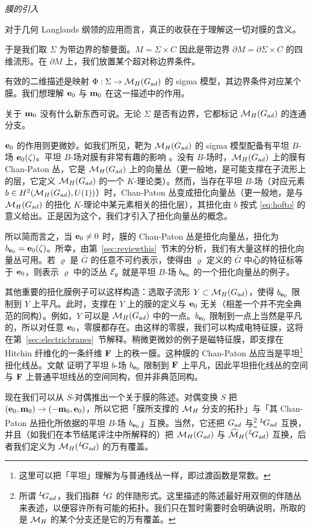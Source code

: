 \par\medskip\emph{膜的引入}

对于几何 Langlands 纲领的应用而言，真正的收获在于理解这一切对膜的含义。

于是我们取 $\Sigma$ 为带边界的黎曼面。$M=\Sigma\times C$ 因此是带边界 $\partial M=\partial\Sigma\times C$ 的四维流形。在 $\partial M$ 上，我们放置某个超对称边界条件。

有效的二维描述是映射 $\Phi:\Sigma\to \MHAD$ 的 sigma 模型，其边界条件对应某个膜。我们想理解 ${\bf e}_0$ 与 ${\bf m}_0$ 在这一描述中的作用。

关于 ${\bf m}_0$ 没有什么新东西可说。无论 $\Sigma$ 是否有边界，它都标记 $\MHAD$ 的连通分支。

${\bf e}_0$ 的作用则更微妙。如我们所见，靶为 $\MHAD$ 的 sigma 模型配备有平坦 $B$-场 ${\bf e}_0(\zeta)$。平坦 $B$-场对膜有非常有趣的影响 \cite{ref102}。没有 $B$-场时，$\MHAD$ 上的膜有 Chan-Paton 丛，它是 $\MHAD$ 上的向量丛（更一般地，是可能支撑在子流形上的层，它定义 $\MHAD$ 的一个 $K$-理论类）。然而，当存在平坦 $B$-场（对应元素 $b\in H^2(\MHAD,U(1))$）时，Chan-Paton 丛变成扭化向量丛（更一般地，是与 $\MHAD$ 的扭化 $K$-理论中某元素相关的扭化层），其扭化由 $b$ 按式 \eqref{eq:hofto} 的意义给出。正是因为这个，我们才引入了扭化向量丛的概念。

所以简而言之，当 ${\bf e}_0\not=0$ 时，膜的 Chan-Paton 丛是扭化向量丛，扭化为 $b_{{\bf e}_0}={\bf e}_0(\zeta)$。所幸，由第~\ref{sec:reviewthis}~节末的分析，我们有大量这样的扭化向量丛可用。若 $\varrho$ 是 $\bar G$ 的任意不可约表示，使得由 $\varrho$ 定义的 $\bar G$ 中心的特征标等于 ${\bf e}_0$，则表示 $\varrho$ 中的泛丛 ${\EUE}_\varrho$ 就是平坦 $B$-场 $b_{{\bf e}_0}$ 的一个扭化向量丛的例子。

其他重要的扭化膜例子可以这样构造：选取子流形 $Y\subset \MHAD$，使得 $b_{{\bf e}_0}$ 限制到 $Y$ 上平凡。此时，支撑在 $Y$ 上的膜的定义与 ${\bf e}_0$ 无关（相差一个并不完全典范的同构）。例如，$Y$ 可以是 $\MHAD$ 中的一点。$b_{{\bf e}_0}$ 限制到一点上当然是平凡的，所以对任意 ${\bf e}_0$，零膜都存在。由这样的零膜，我们可以构成电特征膜，这将在第~\ref{sec:electricbranes}~节解释。稍微更微妙的例子是磁特征膜，即支撑在 Hitchin 纤维化的一条纤维 ${\CMF}$ 上的秩一膜。这种膜的 Chan-Paton 丛应当是平坦\footnote{这里可以把「平坦」理解为与普通线丛一样，即过渡函数是常数。}扭化线丛。文献 \cite{ref21} 证明了平坦 $b$-场 $b_{{\bf e}_0}$ 限制到 ${\CMF}$ 上平凡，因此平坦扭化线丛的空间与 ${\CMF}$ 上普通平坦线丛的空间同构，但并非典范同构。

现在我们可以从 $S$-对偶推出一个关于膜的陈述。对偶变换 $S$ 把 $({\bf e}_0,{\bf m}_0)\to (-{\bf m}_0,{\bf e}_0)$，所以它把「膜所支撑的 $\MH$ 分支的拓扑」与「其 Chan-Paton 丛扭化所依据的平坦 $B$-场 $b_{{\bf e}_0}$」互换。当然，它还把 $G_{\rm ad}$ 与\footnote{所谓 $^L\negthinspace G_{\rm ad}$，我们指群 $^L\negthinspace G$ 的伴随形式。这里描述的陈述最好用双侧的伴随丛来表述，以便容许所有可能的拓扑。我们只在暂时需要时会明确说明，所取的是 $\MH$ 的某个分支还是它的万有覆盖。} $^L\negthinspace G_{{\rm ad}}$ 互换，并且（如我们在本节结尾评注中所解释的）把 $\MH(G_{{\rm ad}})$ 与 $\hat\M_H({}^L\negthinspace G_{{\rm ad}})$ 互换，后者我们定义为 $\MH({}^L\negthinspace G_{{\rm ad}})$ 的万有覆盖。

